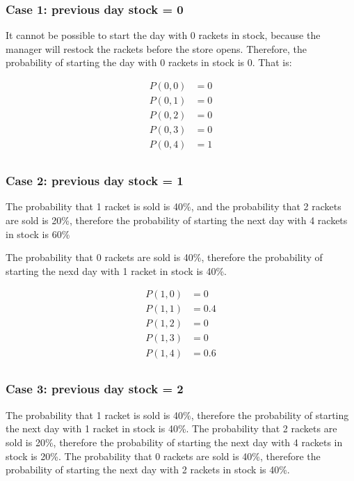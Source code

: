 \documentclass[12pt]{article}
\begin{document}
\begin{enumerate}
\begin{enumerate}
\subsubsection*{Case 1: previous day stock = 0}

It cannot be possible to start the day with 0 rackets in stock, because the manager will restock the rackets before the store opens. Therefore, the probability of starting the day with 0 rackets in stock is 0. That is:

\begin{align*}
P(0, 0) &= 0 \\
P(0, 1) &= 0 \\
P(0, 2) &= 0 \\
P(0, 3) &= 0 \\
P(0, 4) &= 1 \\
\end{align*}

\subsubsection*{Case 2: previous day stock = 1}

The probability that 1 racket is sold is 40\%, and the probability that 2 rackets are sold is 20\%, therefore the probability of starting the next day with 4 rackets in stock is 60\%  

The probability that 0 rackets are sold is 40\%, therefore the probability of starting the nexd day with 1 racket in stock is 40\%.

\begin{align*}
P(1, 0) &= 0 \\
P(1, 1) &= 0.4 \\
P(1, 2) &= 0 \\
P(1, 3) &= 0 \\
P(1, 4) &= 0.6 \\
\end{align*}

\subsubsection*{Case 3: previous day stock = 2}

The probability that 1 racket is sold is 40\%, therefore the probability of starting the next day with 1 racket in stock is 40\%. The probability that 2 rackets are sold is 20\%, therefore the probability of starting the next day with 4 rackets in stock is 20\%. The probability that 0 rackets are sold is 40\%, therefore the probability of starting the next day with 2 rackets in stock is 40\%.


\end{enumerate}
\end{enumerate}
\end{document}
